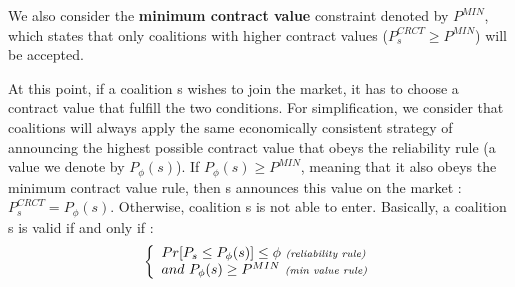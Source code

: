 \documentclass[conference]{IEEEtran}
\begin{document}
We also consider the \textbf{minimum contract value} constraint denoted by $ P^{MIN} $, which states that only coalitions with higher contract values ($ P_{s}^{CRCT} \geq P^{MIN} $) will be accepted.

At this point, if a coalition s wishes to join the market, it has to choose a contract value that fulfill the two conditions. For simplification, we consider that coalitions will always apply the same economically consistent strategy of announcing the highest possible contract value that obeys the reliability rule (a value we denote by $ P_{\phi}(s) $). If $ P_{\phi}(s) \geq P^{MIN} $, meaning that it also obeys the minimum contract value rule, then s announces this value on the market : $ P_{s}^{CRCT} = P_{\phi}(s) $. Otherwise, coalition s is not able to enter.
Basically, a coalition s is valid if and only if :
\begin{equation}
\left\{ \begin{array}{lll}
		Pr[ P_{s} \leq P_{\phi}(s)] \leq \phi\ \textit{{\scriptsize (reliability rule)}} \\
		and\ P_{\phi}(s) \geq P^{MIN}\ \textit{{\scriptsize (min value rule)}}

\end{array} \right. 
\label{rules}
\end{equation}
\end{document}
